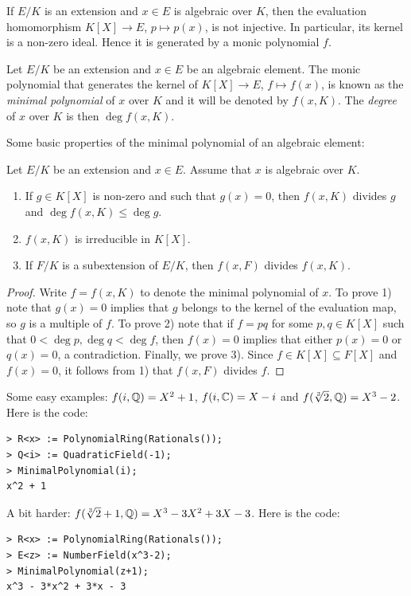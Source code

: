 \lecture 
If $E/K$ is an extension and $x\in E$ is algebraic
over $K$, then the evaluation homomorphism 
$K[X]\to E$, $p\mapsto p(x)$, is not injective. In particular,
its kernel is a non-zero ideal. Hence 
it is generated by a monic polynomial $f$. 

\begin{definition}
	Let $E/K$ be an extension and $x\in E$ be an algebraic element.  The monic
	polynomial that generates the kernel of $K[X]\to E$, $f\mapsto f(x)$, is
	known as the \emph{minimal polynomial} of $x$ over $K$ and it will be
	denoted by $f(x,K)$. The \emph{degree} of $x$ over $K$ is then $\deg
	f(x,K)$. 
\end{definition}

Some basic properties of the minimal polynomial of an algebraic element:

\begin{proposition}
	Let $E/K$ be an extension and $x\in E$. Assume that $x$ is algebraic over $K$. 
	\begin{enumerate}
		\item If $g\in K[X]$ is non-zero and such that $g(x)=0$, then $f(x,K)$ divides $g$ and  
		$\deg f(x,K)\leq\deg g$. 
		\item $f(x,K)$ is irreducible in $K[X]$.
		\item If $F/K$ is a subextension of $E/K$, then $f(x,F)$ divides
			$f(x,K)$. 
	\end{enumerate}
\end{proposition}

\begin{proof}
	Write $f=f(x,K)$ to denote the minimal polynomial of $x$. 
	To prove 1) note that $g(x)=0$ implies that	$g$ belongs to the kernel of
	the evaluation map, so $g$ is a multiple of $f$. To prove 2) 
	note that if $f=pq$ for some $p,q\in K[X]$ such that
	$0<\deg p,\deg q<\deg f$, then $f(x)=0$ implies that 
	either $p(x)=0$ or $q(x)=0$, a
	contradiction. Finally, we prove 3). Since $f\in K[X]\subseteq F[X]$ 
	and $f(x)=0$, it follows from 1) that $f(x,F)$ divides $f$. 
\end{proof}

Some easy examples: $f(i,\mathbb{Q})=X^2+1$, 
$f(i,\mathbb{C})=X-i$ and 
$f(\sqrt[3]{2},\mathbb{Q})=X^3-2$. Here is the code:  
\begin{lstlisting}
> R<x> := PolynomialRing(Rationals());
> Q<i> := QuadraticField(-1);
> MinimalPolynomial(i);
x^2 + 1
\end{lstlisting}
A bit harder: $f(\sqrt[3]{2}+1,\mathbb{Q})=X^3 - 3X^2 + 3X - 3$. Here is the code: 
\begin{lstlisting}
> R<x> := PolynomialRing(Rationals());
> E<z> := NumberField(x^3-2);
> MinimalPolynomial(z+1);
x^3 - 3*x^2 + 3*x - 3
\end{lstlisting}

